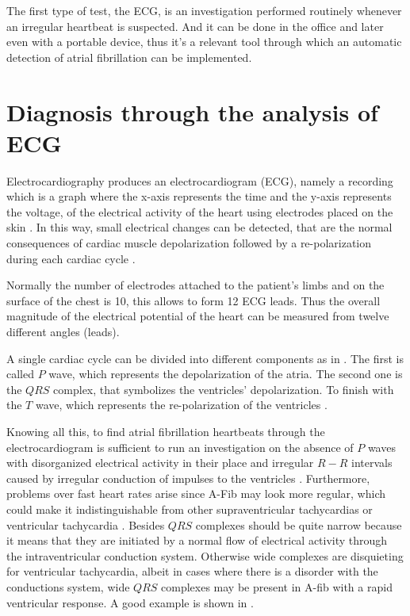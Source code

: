 The first type of test, the ECG, is an investigation performed routinely whenever an irregular heartbeat is suspected. And it can be done in the office and later even with a portable device, thus it's a relevant tool through which an automatic detection of atrial fibrillation can be implemented.

\section{Diagnosis through the analysis of ECG}
\label{sec:ecg_diagnose}
Electrocardiography produces an electrocardiogram (ECG), namely a recording which is a graph where the x-axis represents the time and the y-axis represents the voltage, of the electrical activity of the heart using electrodes placed on the skin \cite[p.74]{lilly2015pathophysiology}. In this way, small electrical changes can be detected, that are the normal consequences of cardiac muscle depolarization followed by a re-polarization during each cardiac cycle .


Normally the number of electrodes attached to the patient's limbs and on the surface of the chest is 10, this allows to form 12 ECG leads. Thus the overall magnitude of the electrical potential of the heart can be measured from twelve different angles (leads). 

A single cardiac cycle can be divided into different components as in . The first is called $P$ wave, which represents the depolarization of the atria. The second one is the $QRS$ complex, that symbolizes the ventricles' depolarization. To finish with the $T$ wave, which represents the re-polarization of the ventricles \cite[p.80]{lilly2015pathophysiology}.


Knowing all this, to find atrial fibrillation heartbeats through the electrocardiogram is sufficient to run an investigation on the absence of $P$ waves with disorganized electrical activity in their place and irregular $R-R$ intervals caused by irregular conduction of impulses to the ventricles \cite{doi:10.1161/CIRCULATIONAHA.106.177292}. Furthermore, problems over fast heart rates arise since A-Fib may look more regular, which could make it indistinguishable from other supraventricular tachycardias or ventricular tachycardia \cite{issa2009clinical}.
Besides $QRS$ complexes should be quite narrow because it means that they are initiated by a normal flow of electrical activity through the intraventricular conduction system. Otherwise wide complexes are disquieting for ventricular tachycardia, albeit in cases where there is a disorder with the conductions system, wide $QRS$ complexes may be present in A-fib with a rapid ventricular response. A good example is shown in .

